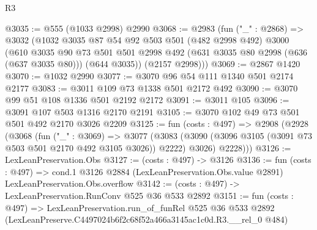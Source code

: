 \begin{lexlean}{R3}
\begin{coremodule}
@3035 := @555 (@1033 @2998) @2990
@3068 := @2983
    (fun ("_" : @2868) =>
    @3032
      (@1032
        @3035
        @87
        @54
        @92
        @503
        @501
        (@482 @2998 @492)
        @3000
        (@610
          @3035
          @90
          @73
          @501
          @501
          @2998
          @492
          (@631 @3035 @80 @2998 (@636 (@637 @3035 @80)))
          (@644 @3035))
        (@2157 @2998)))
@3069 := @2867 @1420
@3070 := @1032 @2990
@3077 := @3070 @96 @54 @111 @1340 @501 @2174 @2177
@3083 := @3011 @109 @73 @1338 @501 @2172 @492
@3090 := @3070 @99 @51 @108 @1336 @501 @2192 @2172
@3091 := @3011 @105
@3096 := @3091 @107 @503 @1316 @2170 @2191
@3105 := @3070 @102 @49 @73 @501 @501 @492 @2170 @3026 @2209
@3125 := fun (costs : @497) =>
  @2908
    (@2928
      (@3068
        (fun ("_" : @3069) =>
        @3077
          (@3083 (@3090 (@3096 @3105 (@3091 @73 @503 @501 @2170 @492 @3105 @3026)) @2222) @3026)
          @2228)))
@3126 := LexLeanPreservation.Obs
@3127 := (costs : @497) -> @3126
@3136 := fun (costs : @497) =>
  cond.{1} @3126 @2884 (LexLeanPreservation.Obs.value @2891) LexLeanPreservation.Obs.overflow
@3142 := (costs : @497) -> LexLeanPreservation.RunConv @525 @36 @533 @2892
@3151 := fun (costs : @497) =>
  LexLeanPreservation.run_of_funRel
    @525
    @36
    @533
    @2892
    (LexLeanPreserve.C4497024b6f2c68f52a466a3145ac1c0d.R3.__rel_0 @484)
\end{coremodule}
\end{lexlean}
